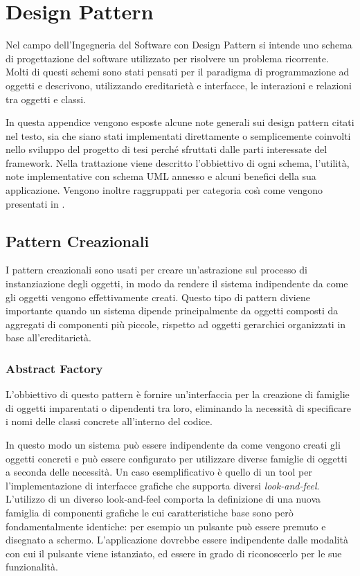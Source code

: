
\chapter{Design Pattern}
\label{a:designpatterns}
Nel campo dell'Ingegneria del Software con Design Pattern si intende uno schema di progettazione del software utilizzato per risolvere un problema ricorrente.
Molti di questi schemi sono stati pensati per il paradigma di programmazione ad oggetti e descrivono, utilizzando ereditariet\`a e interfacce, le interazioni e relazioni tra oggetti e classi.

In questa appendice vengono esposte alcune note generali sui design pattern citati nel testo, sia che siano stati implementati direttamente o semplicemente coinvolti nello sviluppo del progetto di tesi perch\'e sfruttati dalle parti interessate del framework.
Nella trattazione viene descritto l'obbiettivo di ogni schema, l'utilit\`a, note implementative con schema \ac{UML} annesso e alcuni benefici della sua applicazione. Vengono inoltre raggruppati per categoria cos{\`\i} come vengono presentati in \cite{book:designpattern}.

\section{Pattern Creazionali}
I pattern creazionali sono usati per creare un'astrazione sul processo di instanziazione degli oggetti, in modo da rendere il sistema indipendente da come gli oggetti vengono effettivamente creati. Questo tipo di pattern diviene importante quando un sistema dipende principalmente da oggetti composti da aggregati di componenti pi\`u piccole, rispetto ad oggetti gerarchici organizzati in base all'ereditariet\`a.

\subsection{Abstract Factory}
\label{sub:abstractfactory}
L'obbiettivo di questo pattern \`e fornire un'interfaccia per la creazione di famiglie di oggetti imparentati o dipendenti tra loro, eliminando la necessit\`a di specificare i nomi delle classi concrete all'interno del codice.

In questo modo un sistema pu\`o essere indipendente da come vengono creati gli oggetti concreti e pu\`o essere configurato per utilizzare diverse famiglie di oggetti a seconda delle necessit\`a. Un caso esemplificativo \`e quello di un tool per l'implementazione di interfacce grafiche che supporta diversi \textit{look-and-feel}. L'utilizzo di un diverso look-and-feel comporta la definizione di una nuova famiglia di componenti grafiche le cui caratteristiche base sono per\`o fondamentalmente identiche: per esempio un pulsante pu\`o essere premuto e disegnato a schermo. L'applicazione dovrebbe essere indipendente dalle modalit\`a con cui il pulsante viene istanziato, ed essere in grado di riconoscerlo per le sue funzionalit\`a.

